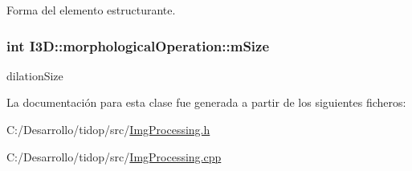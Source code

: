 Forma del elemento estructurante. 

\subsubsection[{\texorpdfstring{m\+Size}{mSize}}]{\setlength{\rightskip}{0pt plus 5cm}int I3\+D\+::morphological\+Operation\+::m\+Size\hspace{0.3cm}{\ttfamily [protected]}}\hypertarget{class_i3_d_1_1morphological_operation_a704f5eda2852dfdb30ef54f92d936e5a}{}\label{class_i3_d_1_1morphological_operation_a704f5eda2852dfdb30ef54f92d936e5a}


dilation\+Size 



La documentación para esta clase fue generada a partir de los siguientes ficheros\+:\begin{DoxyCompactItemize}
\item 
C\+:/\+Desarrollo/tidop/src/\hyperlink{_img_processing_8h}{Img\+Processing.\+h}\item 
C\+:/\+Desarrollo/tidop/src/\hyperlink{_img_processing_8cpp}{Img\+Processing.\+cpp}\end{DoxyCompactItemize}
